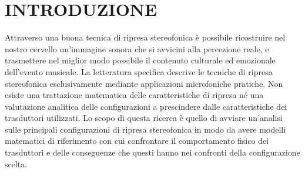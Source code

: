 \newcommand{\mylanguages}{english,italian} %
\newcommand{\mytitle}{Stereophonic Mathematical Models}
\newcommand{\mysubtitle}{Stereophonic Mathematical Models}
\newcommand{\authorone}{Perla Catucci}
\newcommand{\institutione}{Conservatorio N. Piccinni di Bari}
\newcommand{\emailone}{perlacatucci150 @ gmail.com}
\newcommand{\authortwo}{Michele Ruzzi}
\newcommand{\institutiontwo}{Conservatorio N. Piccinni di Bari}
\newcommand{\emailtwo}{m.ruzzi @ icloud.com} %
\newcommand{\authorthree}{Giuseppe Silvi}
\newcommand{\institutionthree}{Conservatorio N. Piccinni di Bari}
\newcommand{\emailthree}{grammaton @ me.com} %


\maketitle
\thispagestyle{empty}
\section*{INTRODUZIONE}
Attraverso una buona tecnica di ripresa stereofonica è possibile ricostruire nel
nostro cervello un’immagine sonora che si avvicini alla percezione reale, e
trasmettere nel miglior modo possibile il contenuto culturale ed emozionale
dell’evento musicale. La letteratura specifica descrive le tecniche di ripresa
stereofonica esclusivamente mediante applicazioni microfoniche pratiche.
\cite{je:05} \cite{gb:09} \cite{bb:98} \cite{fr:21} Non esiste una trattazione matematica
delle caratteristiche di ripresa né una valutazione analitica delle
configurazioni a prescindere dalle caratteristiche dei trasduttori utilizzati.
Lo scopo di questa ricerca è quello di avviare un'analisi sulle principali
configurazioni di ripresa stereofonica in modo da avere modelli matematici di
riferimento con cui confrontare il comportamento fisico dei trasduttori e delle
conseguenze che questi hanno nei confronti della configurazione scelta.

